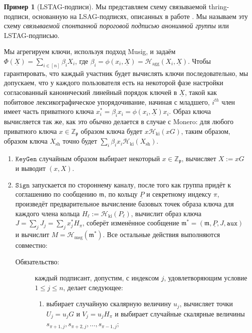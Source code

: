 \documentclass{mrl}
\theoremstyle{definition}
\numberwithin{theorem}{subsection}
\newtheorem{ex}[theorem]{Пример}
\newcommand{\scalarField}{\mathbb{Z}_{\mathfrak{p}}}
\newcommand{\m}{\mathfrak{m}}
\begin{document}
\begin{ex}[LSTAG-подписи]\label{implementation}
Мы представляем схему связываемой thring-подписи, основанную на LSAG-подписях, описанных в работе \cite{liu2004linkable}. Мы называем эту схему \textit{связываемой спонтанной пороговой подписью анонимной группы} или LSTAG-подписью.

Мы агрегируем ключи, используя подход Musig, и задаём $\Phi(\underline{X}) = \sum_{i \in [n]} \beta_i X_i$, где $\beta_i = \phi(x_i, \underline{X}) = \mathcal{H}_{\text{agg}}(X_i, \underline{X})$. Чтобы гарантировать, что каждый участник будет вычислять ключи последовательно, мы допускаем, что у каждого пользователя есть на некоторой фазе настройки согласованный канонический линейный порядок ключей в $\underline{X}$, такой как побитовое лексикографическое упорядочивание, начиная с младшего, $i^{th}$ член имеет часть приватного ключа $x^*_i = \beta_i x_i = \phi(x_i, \underline{X})x_i$. Образ ключа вычисляется так же, как это обычно делается в случае с Monero: для любого приватного ключа $x \in \scalarField$ образом ключа будет $x\mathcal{H}_{\text{ki}}(xG)$, таким образом, образом ключа $X_{\text{sh}}$ точно будет $\sum_i \beta_i x_i \mathcal{H}_{\text{ki}}(X_{\text{sh}})$.

\begin{enumerate}
\item $\texttt{KeyGen}$ случайным образом выбирает некоторый $x \in \scalarField$, вычисляет $X := xG$ и выводит $(x,X)$.

\item $\texttt{Sign}$ запускается по стороннему каналу, после того как группа придёт к соглашению по сообщению $\m$, по кольцу $\underline{P}$ и секретному индексу $\pi$, произведёт предварительное вычисление базовых точек образа ключа для каждого члена кольца $H_\ell := \mathcal{H}_{\text{ki}}(P_\ell)$, вычислит образ ключа $J = \sum_j J_j = \sum_j x^*_j H_\pi$, соберёт изменённое сообщение $\m^* = (\m, \underline{P}, J, \texttt{aux})$ и вычислит $M = \mathcal{H}_{\text{msg}}(\m^*)$. Все остальные действия выполняются совместно:

\begin{description}
\item [Обязательство:] каждый подписант, допустим, с индексом $j$, удовлетворяющим условие $1 \leq j \leq n$, делает следующее:
\begin{enumerate}
\item выбирает случайную скалярную величину $u_j$, вычисляет точки $U_j = u_j G$ и $V_j = u_j H_\pi$ и выбирает случайные скалярные величины $s_{\pi+1, j}, s_{\pi+2, j}, \ldots, s_{\pi-1,j}$;


\end{enumerate}
\end{description}
\end{enumerate}
\end{ex}
\end{document}
